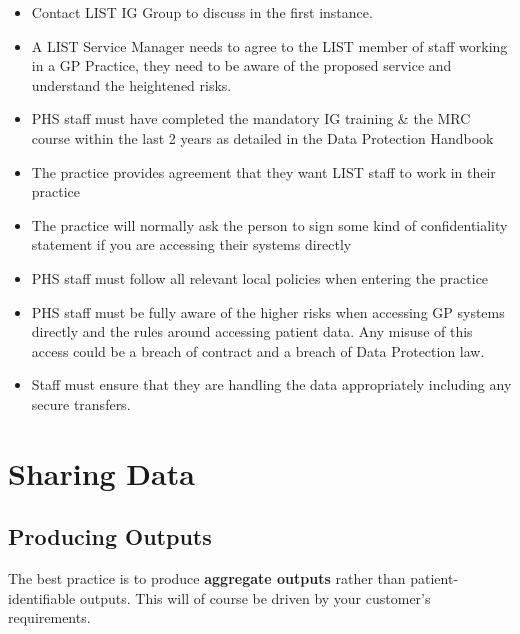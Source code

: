\documentclass[
]{book}
\begin{document}
\begin{itemize}
\item
  Contact LIST IG Group to discuss in the first instance.
\item
  A LIST Service Manager needs to agree to the LIST member of staff working in a GP Practice, they need to be aware of the proposed service and understand the heightened risks.
\item
  PHS staff must have completed the mandatory IG training \& the MRC course within the last 2 years as detailed in the Data Protection Handbook
\item
  The practice provides agreement that they want LIST staff to work in their practice
\item
  The practice will normally ask the person to sign some kind of confidentiality statement if you are accessing their systems directly
\item
  PHS staff must follow all relevant local policies when entering the practice
\item
  PHS staff must be fully aware of the higher risks when accessing GP systems directly and the rules around accessing patient data. Any misuse of this access could be a breach of contract and a breach of Data Protection law.
\item
  Staff must ensure that they are handling the data appropriately including any secure transfers.
\end{itemize}

\hypertarget{sharing-data}{%
\chapter{Sharing Data}\label{sharing-data}}

\hypertarget{producing-outputs}{%
\section{Producing Outputs}\label{producing-outputs}}

The best practice is to produce \textbf{aggregate outputs} rather than patient-identifiable outputs. This will of course be driven by your customer's requirements.
\end{document}
